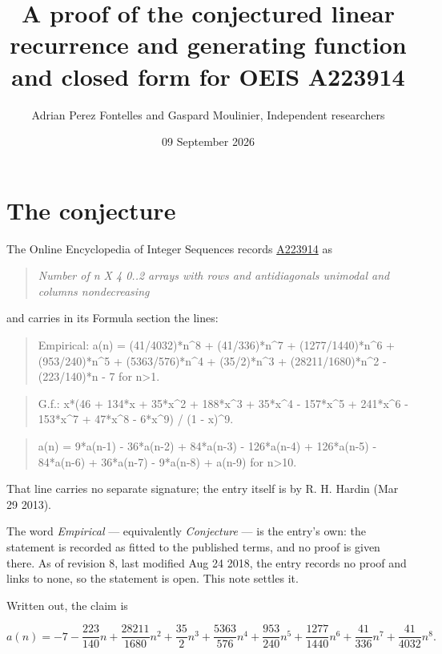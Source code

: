 \documentclass[11pt]{article}
\title{A proof of the conjectured linear recurrence and generating function and closed form for OEIS A223914}
\author{Adrian Perez Fontelles and Gaspard Moulinier, Independent researchers}
\date{09 September 2026}
\theoremstyle{definition}
\begin{document}
\maketitle
\section{The conjecture}

The Online Encyclopedia of Integer Sequences records \href{https://oeis.org/A223914}{A223914} as

\begin{quote}\itshape Number of n X 4 0..2 arrays with rows and antidiagonals unimodal and columns nondecreasing\end{quote}

and carries in its Formula section the lines:

\begin{quote}\ttfamily Empirical: a(n) = (41/4032)*n\textasciicircum{}8 + (41/336)*n\textasciicircum{}7 + (1277/1440)*n\textasciicircum{}6 + (953/240)*n\textasciicircum{}5 + (5363/576)*n\textasciicircum{}4 + (35/2)*n\textasciicircum{}3 + (28211/1680)*n\textasciicircum{}2 - (223/140)*n - 7 for n>1.\end{quote}

\begin{quote}\ttfamily G.f.: x*(46 + 134*x + 35*x\textasciicircum{}2 + 188*x\textasciicircum{}3 + 35*x\textasciicircum{}4 - 157*x\textasciicircum{}5 + 241*x\textasciicircum{}6 - 153*x\textasciicircum{}7 + 47*x\textasciicircum{}8 - 6*x\textasciicircum{}9) / (1 - x)\textasciicircum{}9.\end{quote}

\begin{quote}\ttfamily a(n) = 9*a(n-1) - 36*a(n-2) + 84*a(n-3) - 126*a(n-4) + 126*a(n-5) - 84*a(n-6) + 36*a(n-7) - 9*a(n-8) + a(n-9) for n>10.\end{quote}

That line carries no separate signature; the entry itself is by R. H. Hardin (Mar 29 2013).

The word {\itshape Empirical} --- equivalently {\itshape Conjecture} --- is the entry's own: the statement is recorded as fitted to the published terms, and no proof is given there. As of revision 8, last modified Aug 24 2018, the entry records no proof and links to none, so the statement is open. This note settles it.

Written out, the claim is

\[a(n) = -7 - \frac{223}{140}n + \frac{28211}{1680}n^{2} + \frac{35}{2}n^{3} + \frac{5363}{576}n^{4} + \frac{953}{240}n^{5} + \frac{1277}{1440}n^{6} + \frac{41}{336}n^{7} + \frac{41}{4032}n^{8}.\]
\end{document}
